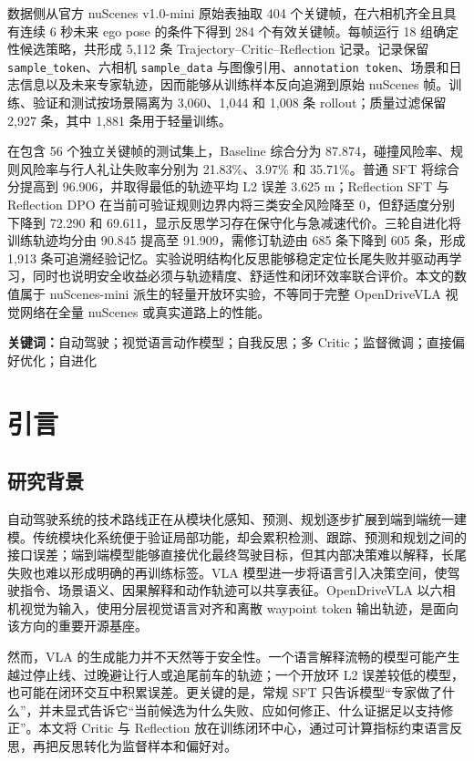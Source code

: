 \documentclass[UTF8,a4paper,12pt,fontset=fandol]{ctexart}
\begin{document}
数据侧从官方 nuScenes v1.0-mini 原始表抽取 404 个关键帧，在六相机齐全且具有连续 6 秒未来 ego pose 的条件下得到 284 个有效关键帧。每帧运行 18 组确定性候选策略，共形成 5,112 条 Trajectory--Critic--Reflection 记录。记录保留 \texttt{sample\_token}、六相机 \texttt{sample\_data} 与图像引用、\texttt{annotation token}、场景和日志信息以及未来专家轨迹，因而能够从训练样本反向追溯到原始 nuScenes 帧。训练、验证和测试按场景隔离为 3,060、1,044 和 1,008 条 rollout；质量过滤保留 2,927 条，其中 1,881 条用于轻量训练。

在包含 56 个独立关键帧的测试集上，Baseline 综合分为 87.874，碰撞风险率、规则风险率与行人礼让失败率分别为 21.83\%、3.97\% 和 35.71\%。普通 SFT 将综合分提高到 96.906，并取得最低的轨迹平均 L2 误差 3.625 m；Reflection SFT 与 Reflection DPO 在当前可验证规则边界内将三类安全风险降至 0，但舒适度分别下降到 72.290 和 69.611，显示反思学习存在保守化与急减速代价。三轮自进化将训练轨迹均分由 90.845 提高至 91.909，需修订轨迹由 685 条下降到 605 条，形成 1,913 条可追溯经验记忆。实验说明结构化反思能够稳定定位长尾失败并驱动再学习，同时也说明安全收益必须与轨迹精度、舒适性和闭环效率联合评价。本文的数值属于 nuScenes-mini 派生的轻量开放环实验，不等同于完整 OpenDriveVLA 视觉网络在全量 nuScenes 或真实道路上的性能。

\noindent\textbf{关键词：}自动驾驶；视觉语言动作模型；自我反思；多 Critic；监督微调；直接偏好优化；自进化

\section{引言}
\subsection{研究背景}
自动驾驶系统的技术路线正在从模块化感知、预测、规划逐步扩展到端到端统一建模。传统模块化系统便于验证局部功能，却会累积检测、跟踪、预测和规划之间的接口误差；端到端模型能够直接优化最终驾驶目标，但其内部决策难以解释，长尾失败也难以形成明确的再训练标签。VLA 模型进一步将语言引入决策空间，使驾驶指令、场景语义、因果解释和动作轨迹可以共享表征。OpenDriveVLA 以六相机视觉为输入，使用分层视觉语言对齐和离散 waypoint token 输出轨迹，是面向该方向的重要开源基座。

然而，VLA 的生成能力并不天然等于安全性。一个语言解释流畅的模型可能产生越过停止线、过晚避让行人或追尾前车的轨迹；一个开放环 L2 误差较低的模型，也可能在闭环交互中积累误差。更关键的是，常规 SFT 只告诉模型“专家做了什么”，并未显式告诉它“当前候选为什么失败、应如何修正、什么证据足以支持修正”。本文将 Critic 与 Reflection 放在训练闭环中心，通过可计算指标约束语言反思，再把反思转化为监督样本和偏好对。
\end{document}
